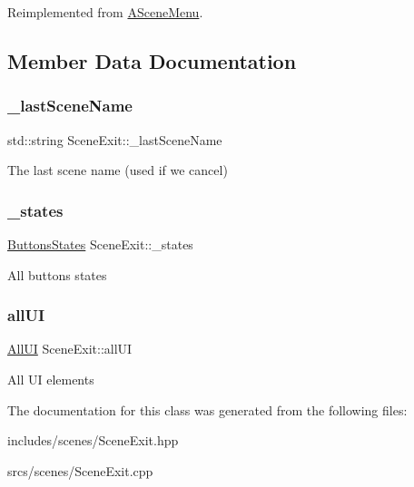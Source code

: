 Reimplemented from \hyperlink{class_a_scene_menu_a1deeb5fd9be97376998cd2af36f29744}{A\+Scene\+Menu}.



\subsection{Member Data Documentation}
\mbox{\label{class_scene_exit_ab79e5e47529f081f0ebe4298b5be4c97}} 
\subsubsection{\texorpdfstring{\+\_\+last\+Scene\+Name}{\_lastSceneName}}
{\footnotesize\ttfamily std\+::string Scene\+Exit\+::\+\_\+last\+Scene\+Name\hspace{0.3cm}{\ttfamily [protected]}}

The last scene name (used if we cancel) \mbox{\label{class_scene_exit_a46626e6689a0ab8eb87a8040e77e7849}} 
\subsubsection{\texorpdfstring{\+\_\+states}{\_states}}
{\footnotesize\ttfamily \hyperlink{struct_scene_exit_1_1_buttons_states}{Buttons\+States} Scene\+Exit\+::\+\_\+states\hspace{0.3cm}{\ttfamily [protected]}}

All buttons states \mbox{\label{class_scene_exit_ac20369aa55f37dff9d8016f3245802e2}} 
\subsubsection{\texorpdfstring{all\+UI}{allUI}}
{\footnotesize\ttfamily \hyperlink{struct_scene_exit_1_1_all_u_i}{All\+UI} Scene\+Exit\+::all\+UI\hspace{0.3cm}{\ttfamily [protected]}}

All UI elements 

The documentation for this class was generated from the following files\+:\begin{DoxyCompactItemize}
\item 
includes/scenes/Scene\+Exit.\+hpp\item 
srcs/scenes/Scene\+Exit.\+cpp\end{DoxyCompactItemize}
